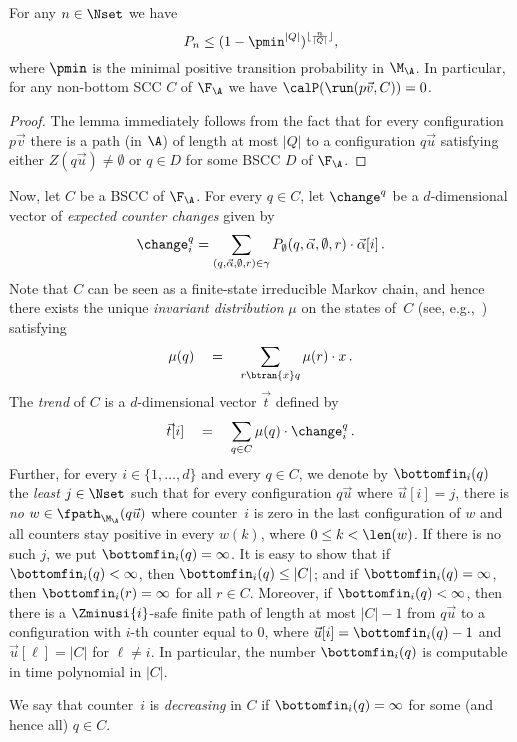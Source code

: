 \begin{lemma}\label{lem:F_A-BSCC}
  For any $n \in \Nset$ we have $$P_n \leq (1 - \pmin^{|Q|})^{\lfloor\frac{n}{|Q|}\rfloor},$$ where $\pmin$ is the minimal positive transition probability in $\M_\A$.
  In particular, for any non-bottom SCC $C$ of $\F_\A$ we have 
  $\calP(\run(p\vec{v},C)) = 0$.
\end{lemma}
\begin{proof}
 The lemma immediately follows from the fact that for every configuration $p\vec{v}$ there is a path (in $\A$) of length at most $|Q|$ to a configuration $q\vec{u}$ satisfying either $Z(q\vec{u})\neq \emptyset$ or $q\in D$ for some BSCC $D$ of $\F_\A$.
\end{proof}


Now, let $C$ be a BSCC of $\F_{\A}$. For every $q \in C$, let 
$\change^q$ be a $d$-dimensional vector of \emph{expected counter changes}
given by 
\[
   \change^q_i = 
   \sum_{(q,\vec{\alpha},\emptyset,r) \in \gamma} 
     P_{\emptyset}(q,\vec{\alpha},\emptyset,r) \cdot \vec{\alpha}[i] \,.
\]
Note that $C$ can be seen
as a finite-state irreducible Markov chain, and hence there exists the
unique \emph{invariant distribution} $\mu$ on the states of~$C$ 
(see, e.g.,~\cite{KS:book}) satisfying
\[
\mu(q)\quad =\quad \sum_{r\btran{x} q} \mu(r)\cdot x \,.
\]
The \emph{trend} of $C$ is a $d$-dimensional vector $\vec{t}$  defined by
\[
  \vec{t}[i] \quad = \quad \sum_{q \in C} \mu(q) \cdot \change^q_i \,.
\]
Further, for every $i \in \{1,\ldots,d\}$ and every $q\in C$, we denote
by $\bottomfin_i(q)$ the \emph{least} $j \in \Nset$ such that 
for every configuration $q \vec{u}$ where $\vec{u}[i] = j$,
there is \emph{no} $w \in \fpath_{\M_\A}(q \vec{u})$ where
counter~$i$ is zero in the last configuration of $w$ and all counters
stay positive in every $w(k)$, where $0 \leq k < \len(w)$.
If there is no such $j$, we put $\bottomfin_i(q) = \infty$.
It is easy to show that if $\bottomfin_i(q) < \infty$, then $\bottomfin_i(q)
\leq |C|$; and if $\bottomfin_i(q) = \infty$, then $\bottomfin_i(r)
= \infty$ for all $r \in C$. Moreover, if $\bottomfin_i(q) < \infty$, then there is a $\Zminusi{i}$-safe finite path of length at most $|C|-1$ from $q\vec{u}$ to a configuration with $i$-th counter equal to 0, where $\vec{u}[i]=\bottomfin_i(q)-1$ and $\vec{u}[\ell]=|C|$ for $\ell\neq i$. In particular, the number $\bottomfin_i(q)$ is computable in time polynomial in $|C|$.

We say that counter~$i$ is
\emph{decreasing} in $C$ if $\bottomfin_i(q) = \infty$ for some (and
hence all) $q \in C$.

